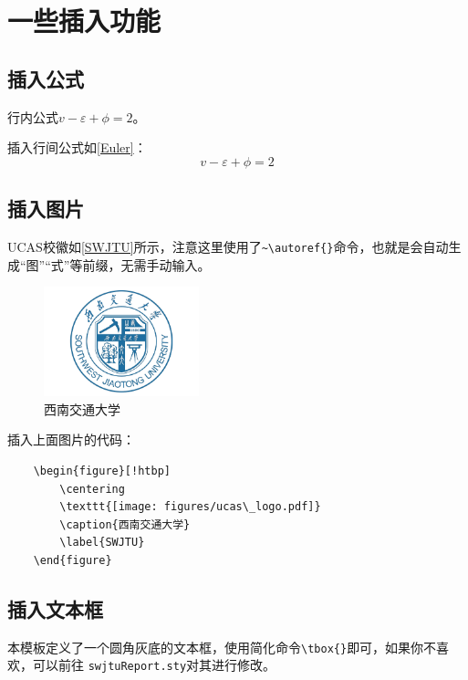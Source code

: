 \section{一些插入功能}
\subsection{插入公式}
行内公式$v-\varepsilon+\phi=2$。

插入行间公式如\autoref{Euler}：
\begin{equation}
    v-\varepsilon+\phi=2
    \label{Euler}
\end{equation}

\subsection{插入图片}
UCAS校徽如\autoref{SWJTU}所示，注意这里使用了\verb|~\autoref{}|命令，也就是会自动生成“图”“式”等前缀，无需手动输入。

\begin{figure}[!htbp]
    \centering
    \includegraphics[width =0.4\textwidth]{figures/swjtu_logo2.pdf}
    \caption{西南交通大学}
    \label{SWJTU}
\end{figure}

插入上面图片的代码：

\begin{verbatim}
    \begin{figure}[!htbp]
        \centering
        \texttt{[image: figures/ucas\_logo.pdf]}
        \caption{西南交通大学}
        \label{SWJTU}
    \end{figure}
\end{verbatim}

\subsection{插入文本框}
本模板定义了一个圆角灰底的文本框，使用简化命令\verb|\tbox{}|即可，如果你不喜欢，可以前往 \texttt{swjtuReport.sty}对其进行修改。



